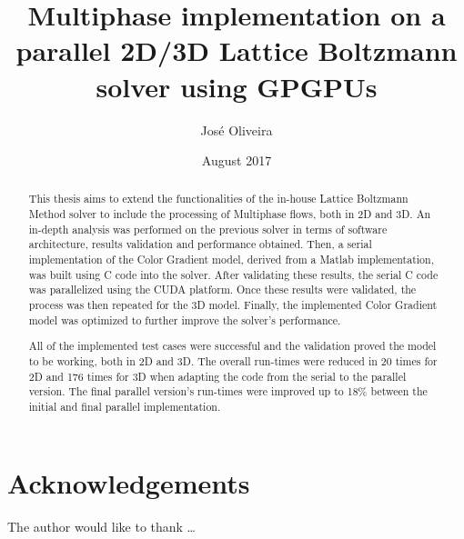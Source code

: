 \documentclass[12pt, openany]{book}
\title{Multiphase implementation on a parallel 2D/3D Lattice Boltzmann solver
	using GPGPUs}
\author{José Oliveira}
\date{August 2017}
\begin{document}
\frontmatter

\maketitle

\begin{abstract}
  This thesis aims to extend the functionalities of the in-house Lattice Boltzmann Method solver to include the processing of Multiphase flows, both in 2D and 3D. An in-depth analysis was performed on the previous solver in terms of software architecture, results validation and performance obtained. Then, a serial implementation of the Color Gradient model, derived from a Matlab implementation, was built using C code into the solver. After validating these results, the serial C code was parallelized using the CUDA platform. Once these results were validated, the process was then repeated for the 3D model. Finally, the implemented Color Gradient model was optimized to further improve the solver's performance. \par
  All of the implemented test cases were successful and the validation proved the model to be working, both in 2D and 3D. The overall run-times were reduced in 20 times for 2D and 176 times for 3D when adapting the code from the serial to the parallel version. The final parallel version's run-times were improved up to 18\% between the initial and final parallel implementation.  
\end{abstract}

\sstableofcontents

\sslistoffigures

\sslistoftables

\begin{listofabbreviations}
\end{listofabbreviations}

\chapter{Acknowledgements}
The author would like to thank \dots
\end{document}

